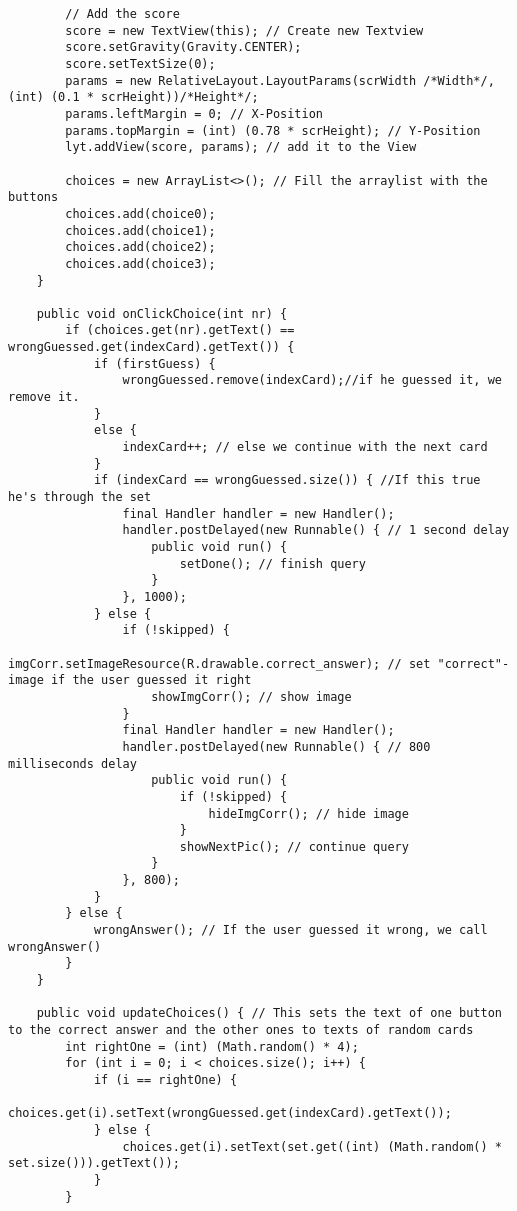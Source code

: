 \begin{lstlisting}
        // Add the score
        score = new TextView(this); // Create new Textview
        score.setGravity(Gravity.CENTER);
        score.setTextSize(0);
        params = new RelativeLayout.LayoutParams(scrWidth /*Width*/, (int) (0.1 * scrHeight))/*Height*/;
        params.leftMargin = 0; // X-Position
        params.topMargin = (int) (0.78 * scrHeight); // Y-Position
        lyt.addView(score, params); // add it to the View

        choices = new ArrayList<>(); // Fill the arraylist with the buttons
        choices.add(choice0);
        choices.add(choice1);
        choices.add(choice2);
        choices.add(choice3);
    }

    public void onClickChoice(int nr) {
        if (choices.get(nr).getText() == wrongGuessed.get(indexCard).getText()) {
            if (firstGuess) {
                wrongGuessed.remove(indexCard);//if he guessed it, we remove it.
            }
            else {
                indexCard++; // else we continue with the next card
            }
            if (indexCard == wrongGuessed.size()) { //If this true he's through the set
                final Handler handler = new Handler();
                handler.postDelayed(new Runnable() { // 1 second delay
                    public void run() {
                        setDone(); // finish query
                    }
                }, 1000);
            } else {
                if (!skipped) {
                    imgCorr.setImageResource(R.drawable.correct_answer); // set "correct"-image if the user guessed it right
                    showImgCorr(); // show image
                }
                final Handler handler = new Handler();
                handler.postDelayed(new Runnable() { // 800 milliseconds delay
                    public void run() {
                        if (!skipped) {
                            hideImgCorr(); // hide image
                        }
                        showNextPic(); // continue query
                    }
                }, 800);
            }
        } else {
            wrongAnswer(); // If the user guessed it wrong, we call wrongAnswer()
        }
    }

    public void updateChoices() { // This sets the text of one button to the correct answer and the other ones to texts of random cards
        int rightOne = (int) (Math.random() * 4);
        for (int i = 0; i < choices.size(); i++) {
            if (i == rightOne) {
                choices.get(i).setText(wrongGuessed.get(indexCard).getText());
            } else {
                choices.get(i).setText(set.get((int) (Math.random() * set.size())).getText());
            }
        }


\end{lstlisting}
